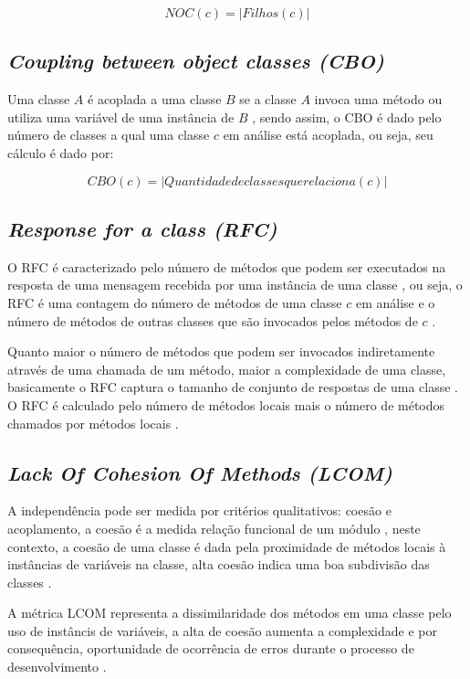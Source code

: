 \documentclass[
	12pt,				%
	oneside,			%
	a4paper,			%
	english,			%
	brazil				%
	]{abntex2ppgsi}
\begin{document}
\begin{equation}
  NOC(c) = |Filhos(c)|
	\label{eq:calc-noc}
\end{equation}


\subsection{\textit{Coupling between object classes (CBO)}}
Uma classe $A$ é acoplada a uma classe $B$ se a classe $A$ invoca uma método ou utiliza uma variável de uma instância de $B$ \cite{kan95}, sendo assim, o CBO é dado pelo número de classes a qual uma classe $c$ em análise está acoplada, ou seja, seu cálculo é dado por:

\begin{equation}
  CBO(c) = |Quantidade de classes que relaciona(c)|
	\label{eq:calc-cbo}
\end{equation}

\subsection{\textit{Response for a class (RFC)}}
O RFC é caracterizado pelo número de métodos que podem ser executados na resposta de uma mensagem recebida por uma instância de uma classe \cite{kan95}, ou seja, o RFC é uma contagem do número de métodos de uma classe $c$ em análise e o número de métodos de outras classes que são invocados pelos métodos de $c$ \cite{bruntink04}.

Quanto maior o número de métodos que podem ser invocados indiretamente através de uma chamada de um método, maior a complexidade de uma classe, basicamente o RFC captura o tamanho de conjunto de respostas de uma classe \cite{kan95}. O RFC é calculado pelo número de métodos locais mais o número de métodos chamados por métodos locais \cite{kan95}.


\subsection{\textit{Lack Of Cohesion Of Methods (LCOM)}}
A independência pode ser medida por critérios qualitativos: coesão e acoplamento, a coesão é a medida relação funcional de um módulo \cite{pressman2009engenharia}, neste contexto, a coesão de uma classe é dada pela proximidade de métodos locais à instâncias de variáveis na classe, alta coesão indica uma boa subdivisão das classes \cite{kan95}.

A métrica LCOM representa a dissimilaridade dos métodos em uma classe pelo uso de instâncis de variáveis, a alta de coesão aumenta a complexidade e por consequência, oportunidade de ocorrência de erros durante o processo de desenvolvimento \cite{kan95}.
\end{document}
